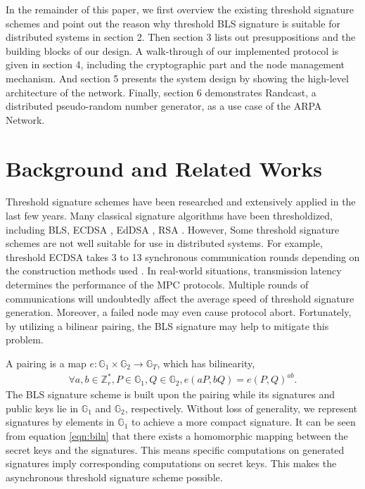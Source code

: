 \documentclass[11pt]{article}
\begin{document}
In the remainder of this paper, we first overview the existing threshold signature schemes and point out the reason why threshold BLS signature is suitable for distributed systems in section 2. Then section 3 lists out presuppositions and the building blocks of our design. A walk-through of our implemented protocol is given in section 4, including the cryptographic part and the node management mechanism. And section 5 presents the system design by showing the high-level architecture of the network. Finally, section 6 demonstrates Randcast, a distributed pseudo-random number generator, as a use case of the ARPA Network.

\section{Background and Related Works}

Threshold signature schemes have been researched and extensively applied in the last few years. Many classical signature algorithms have been thresholdized, including BLS, ECDSA \cite{gennaro2018fast}, EdDSA \cite{stinson2001provably}, RSA \cite{damgaard2001practical}. However, Some threshold signature schemes are not well suitable for use in distributed systems. For example, threshold ECDSA takes 3 to 13 synchronous communication rounds depending on the construction methods used \cite{aumasson2020survey}. In real-world situations, transmission latency determines the performance of the MPC protocols. Multiple rounds of communications will undoubtedly affect the average speed of threshold signature generation. Moreover, a failed node may even cause protocol abort. Fortunately, by utilizing a bilinear pairing, the BLS signature may help to mitigate this problem.

A pairing is a map $e:\mathbb{G}_1 \times \mathbb{G}_2 \to \mathbb{G}_T$, which has bilinearity, 
\begin{align}\label{eqn:biln}
    \forall a,b \in \mathbb{Z}_r^*, P \in \mathbb{G}_1, Q \in \mathbb{G}_2, e(aP,bQ)=e(P,Q)^{ab}.
\end{align}
The BLS signature scheme is built upon the pairing while its signatures and public keys lie in $\mathbb{G}_1$ and $\mathbb{G}_2$, respectively. Without loss of generality, we represent signatures by elements in $\mathbb{G}_1$ to achieve a more compact signature. It can be seen from equation \ref{eqn:biln} that there exists a homomorphic mapping between the secret keys and the signatures. This means specific computations on generated signatures imply corresponding computations on secret keys. This makes the asynchronous threshold signature scheme possible.
\end{document}
